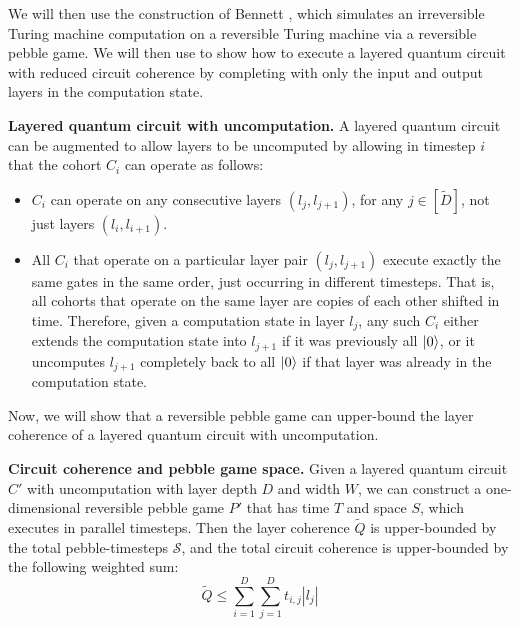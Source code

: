 We will then use the construction of Bennett \cite{Bennett1989},
which simulates an irreversible Turing machine computation on a
reversible Turing machine via a reversible pebble game. We will then
use to show how to execute a layered quantum circuit with reduced
circuit coherence by completing with only the input and output layers
in the computation state.

\begin{definition}{\textbf{Layered quantum circuit with uncomputation.}}
A layered quantum circuit can be augmented to allow layers to be uncomputed
by allowing in timestep $i$ that the cohort $C_i$ can operate as follows:

\begin{itemize}
\item $C_i$ can operate on any consecutive layers $(l_{j},l_{j+1})$,
for any $j \in [\tilde{D}]$,
not just layers $(l_{i},l_{i+1})$.
\item All $C_i$ that operate on a particular layer pair $(l_{j},l_{j+1})$
execute exactly the same gates in the same order, just occurring in
different timesteps. That is, all cohorts that operate on the
same layer are copies of each other shifted in time.
Therefore, given a computation state in layer $l_{j}$, any such
$C_i$ either extends the computation state into $l_{j+1}$ if it
was previously all $\left\vert{0}\right\rangle$, or it uncomputes $l_{j+1}$ completely
back to all $\left\vert{0}\right\rangle$ if that layer was already in the computation state.
\end{itemize}
\end{definition}


Now, we will show that a reversible pebble game can upper-bound the
layer coherence of a layered quantum circuit with uncomputation.

\begin{theorem}{\textbf{Circuit coherence and pebble game space.}}
Given a layered quantum circuit $C'$ with uncomputation with layer depth $D$ and width $W$, we
can construct a one-dimensional
reversible pebble game $P'$ that has time $T$
and space $S$, which executes in parallel timesteps.
Then the layer coherence $\tilde{Q}$ is upper-bounded by the
total pebble-timesteps $\mathcal{S}$, and the total circuit coherence
is upper-bounded by the following weighted sum:
\begin{equation}
\tilde{Q} \le \sum_{i=1}^D \sum_{j=1}^D t_{i,j} |l_j|
\end{equation}
\label{thm:pg-cc}
\end{theorem}

